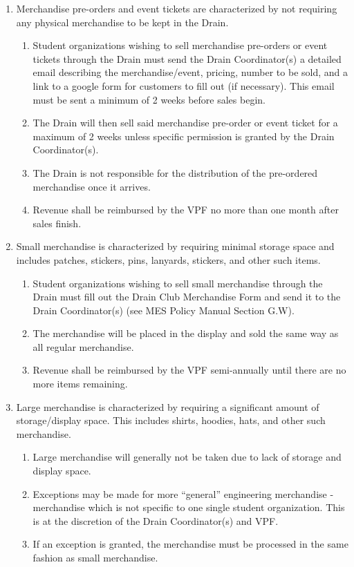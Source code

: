 \begin{enumerate}
 \item
  Merchandise pre-orders and event tickets are characterized by not requiring any physical merchandise to be kept in the Drain.

  \begin{enumerate}
   \item
    Student organizations wishing to sell merchandise pre-orders or event tickets through the Drain must send the Drain Coordinator(s) a detailed email describing the merchandise/event, pricing, number to be sold, and a link to a google form for customers to fill out (if necessary). This email must be sent a minimum of 2 weeks before sales begin.
   \item
    The Drain will then sell said merchandise pre-order or event ticket for a maximum of 2 weeks unless specific permission is granted by the Drain Coordinator(s).
   \item
    The Drain is not responsible for the distribution of the pre-ordered merchandise once it arrives.
   \item
    Revenue shall be reimbursed by the VPF no more than one month after sales finish.
  \end{enumerate}
 \item
  Small merchandise is characterized by requiring minimal storage space and includes patches, stickers, pins, lanyards, stickers, and other such items.

  \begin{enumerate}
   \item
    Student organizations wishing to sell small merchandise through the Drain must fill out the Drain Club Merchandise Form and send it to the Drain Coordinator(s) (see MES Policy Manual Section G.W).
   \item
    The merchandise will be placed in the display and sold the same way as all regular merchandise.
   \item
    Revenue shall be reimbursed by the VPF semi-annually until there are no more items remaining.
  \end{enumerate}
 \item
  Large merchandise is characterized by requiring a significant amount of storage/display space. This includes shirts, hoodies, hats, and other such merchandise.

  \begin{enumerate}
   \item
    Large merchandise will generally not be taken due to lack of storage and display space.
   \item
    Exceptions may be made for more ``general'' engineering merchandise - merchandise which is not specific to one single student organization. This is at the discretion of the Drain Coordinator(s) and VPF.
   \item
    If an exception is granted, the merchandise must be processed in the same fashion as small merchandise.
  \end{enumerate}
\end{enumerate}


